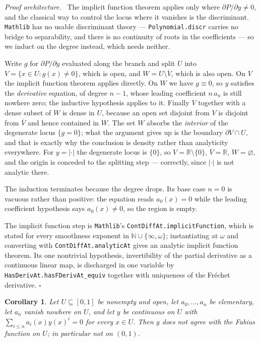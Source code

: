 \documentclass[11pt,oneside]{article}
\newtheorem{corollary}[theorem]{Corollary}
\theoremstyle{definition}
\theoremstyle{remark}
\newcommand{\R}{\mathbb R}
\newcommand{\N}{\mathbb N}
\newenvironment{proofidea}{\par\smallskip\noindent\textit{Proof architecture.}\ }{\hfill$\square$\par\smallskip}
\begin{document}
\begin{proofidea}
The implicit function theorem applies only where $\partial P/\partial y\ne 0$,
and the classical way to control the locus where it vanishes is the
discriminant.  \texttt{Mathlib} has no usable discriminant theory ---
\texttt{Polynomial.discr} carries no bridge to separability, and there is no
continuity of roots in the coefficients --- so we induct on the degree
instead, which needs neither.

Write $g$ for $\partial P/\partial y$ evaluated along the branch and split
$U$ into $V=\{x\in U: g(x)\ne0\}$, which is open, and
$W=U\setminus\overline V$, which is also open.  On $V$ the implicit function
theorem applies directly.  On $W$ we have $g\equiv 0$, so $y$ satisfies the
\emph{derivative} equation, of degree $n-1$, whose leading coefficient
$n\,a_n$ is still nowhere zero; the inductive hypothesis applies to it.
Finally $V$ together with a dense subset of $W$ is dense in $U$, because an
open set disjoint from $V$ is disjoint from $\overline V$ and hence contained
in $W$.  The set $W$ absorbs the \emph{interior} of the degenerate locus
$\{g=0\}$; what the argument gives up is the boundary $\partial V\cap U$, and
that is exactly why the conclusion is density rather than analyticity
everywhere.  For $y=|\cdot|$ the degenerate locus is $\{0\}$, so $V=\R
\setminus\{0\}$, $\overline V=\R$, $W=\varnothing$, and the origin is conceded
to the splitting step --- correctly, since $|\cdot|$ is not analytic there.

The induction terminates because the degree drops.  Its base case $n=0$ is
vacuous rather than positive: the equation reads $a_0(x)=0$ while the leading
coefficient hypothesis says $a_0(x)\ne0$, so the region is empty.

The implicit function step is \texttt{Mathlib}'s
\texttt{ContDiffAt.implicitFunction}, which is stated for every smoothness
exponent in $\N\cup\{\infty,\omega\}$; instantiating at $\omega$ and converting
with \texttt{ContDiffAt.analyticAt} gives an analytic implicit function
theorem.  Its one nontrivial hypothesis, invertibility of the partial
derivative as a continuous linear map, is discharged in one variable by
\texttt{HasDerivAt.hasFDerivAt\_equiv} together with uniqueness of the
Fréchet derivative.
\end{proofidea}

\begin{corollary}\label{cor:algebraic}
Let $U\subseteq[0,1]$ be nonempty and open, let $a_0,\dots,a_n$ be elementary,
let $a_n$ vanish nowhere \emph{on $U$}, and let $y$ be continuous \emph{on
$U$} with $\sum_{i\le n}a_i(x)y(x)^i=0$ for every $x\in U$.  Then $y$ does not
agree with the Fabius function on $U$; in particular not on $(0,1)$.
\end{corollary}
\end{document}
